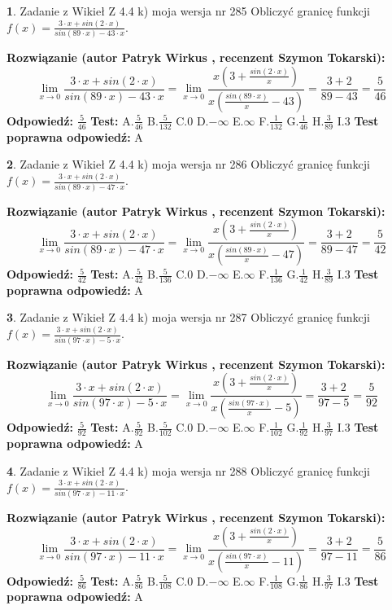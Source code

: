 \documentclass[12pt, a4paper]{article}
\theoremstyle{definition} %
\newtheorem{zad}{}
\newcommand{\zadStart}[1]{\begin{zad}#1\newline}
\newcommand{\zadStop}{\end{zad}}
\newcommand{\rozwStart}[2]{\noindent \textbf{Rozwiązanie (autor #1 , recenzent #2): }\newline}
\newcommand{\rozwStop}{\newline}
\newcommand{\odpStart}{\noindent \textbf{Odpowiedź:}\newline}
\newcommand{\odpStop}{\newline}
\newcommand{\testStart}{\noindent \textbf{Test:}\newline}
\newcommand{\testStop}{\newline}
\newcommand{\kluczStart}{\noindent \textbf{Test poprawna odpowiedź:}\newline}
\newcommand{\kluczStop}{\newline}
\begin{document}
\zadStart{Zadanie z Wikieł Z 4.4 k) moja wersja nr 285}
Obliczyć granicę funkcji $f(x)=\frac{3\cdot x +sin(2\cdot x)}{sin(89\cdot x) -43\cdot x}$.
\zadStop
\rozwStart{Patryk Wirkus}{Szymon Tokarski}
$$\lim\limits_{x\to 0}\frac{3\cdot x +sin(2\cdot x)}{sin(89\cdot x) -43\cdot x}
=\lim\limits_{x\to 0}\frac{x(3+\frac{sin(2\cdot x)}{x})}{x(\frac{sin(89\cdot x)}{x}-43)}
=\frac{3+2}{89-43} = \frac{5}{46}$$
\rozwStop
\odpStart
$\frac{5}{46}$
\odpStop
\testStart
A.$\frac{5}{46}$
B.$\frac{5}{132}$
C.$0$
D.$-\infty$
E.$\infty$
F.$\frac{1}{132}$
G.$\frac{1}{46}$
H.$\frac{3}{89}$
I.$3$
\testStop
\kluczStart
A
\kluczStop



\zadStart{Zadanie z Wikieł Z 4.4 k) moja wersja nr 286}
Obliczyć granicę funkcji $f(x)=\frac{3\cdot x +sin(2\cdot x)}{sin(89\cdot x) -47\cdot x}$.
\zadStop
\rozwStart{Patryk Wirkus}{Szymon Tokarski}
$$\lim\limits_{x\to 0}\frac{3\cdot x +sin(2\cdot x)}{sin(89\cdot x) -47\cdot x}
=\lim\limits_{x\to 0}\frac{x(3+\frac{sin(2\cdot x)}{x})}{x(\frac{sin(89\cdot x)}{x}-47)}
=\frac{3+2}{89-47} = \frac{5}{42}$$
\rozwStop
\odpStart
$\frac{5}{42}$
\odpStop
\testStart
A.$\frac{5}{42}$
B.$\frac{5}{136}$
C.$0$
D.$-\infty$
E.$\infty$
F.$\frac{1}{136}$
G.$\frac{1}{42}$
H.$\frac{3}{89}$
I.$3$
\testStop
\kluczStart
A
\kluczStop



\zadStart{Zadanie z Wikieł Z 4.4 k) moja wersja nr 287}
Obliczyć granicę funkcji $f(x)=\frac{3\cdot x +sin(2\cdot x)}{sin(97\cdot x) -5\cdot x}$.
\zadStop
\rozwStart{Patryk Wirkus}{Szymon Tokarski}
$$\lim\limits_{x\to 0}\frac{3\cdot x +sin(2\cdot x)}{sin(97\cdot x) -5\cdot x}
=\lim\limits_{x\to 0}\frac{x(3+\frac{sin(2\cdot x)}{x})}{x(\frac{sin(97\cdot x)}{x}-5)}
=\frac{3+2}{97-5} = \frac{5}{92}$$
\rozwStop
\odpStart
$\frac{5}{92}$
\odpStop
\testStart
A.$\frac{5}{92}$
B.$\frac{5}{102}$
C.$0$
D.$-\infty$
E.$\infty$
F.$\frac{1}{102}$
G.$\frac{1}{92}$
H.$\frac{3}{97}$
I.$3$
\testStop
\kluczStart
A
\kluczStop



\zadStart{Zadanie z Wikieł Z 4.4 k) moja wersja nr 288}
Obliczyć granicę funkcji $f(x)=\frac{3\cdot x +sin(2\cdot x)}{sin(97\cdot x) -11\cdot x}$.
\zadStop
\rozwStart{Patryk Wirkus}{Szymon Tokarski}
$$\lim\limits_{x\to 0}\frac{3\cdot x +sin(2\cdot x)}{sin(97\cdot x) -11\cdot x}
=\lim\limits_{x\to 0}\frac{x(3+\frac{sin(2\cdot x)}{x})}{x(\frac{sin(97\cdot x)}{x}-11)}
=\frac{3+2}{97-11} = \frac{5}{86}$$
\rozwStop
\odpStart
$\frac{5}{86}$
\odpStop
\testStart
A.$\frac{5}{86}$
B.$\frac{5}{108}$
C.$0$
D.$-\infty$
E.$\infty$
F.$\frac{1}{108}$
G.$\frac{1}{86}$
H.$\frac{3}{97}$
I.$3$
\testStop
\kluczStart
A
\kluczStop
\end{document}
